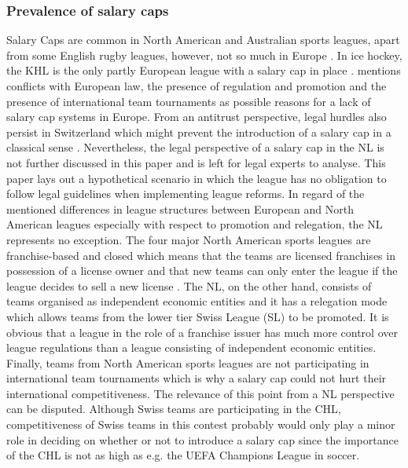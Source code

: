 \documentclass[12pt, a4paper]{article}
\begin{document}
\subsubsection{Prevalence of salary caps}

Salary Caps are common in North American and Australian sports leagues, apart from some English rugby leagues, however, not so much in Europe \citep{dietl_effect_2009}. In ice hockey, the KHL is the only partly European league with a salary cap in place \citep{noauthor_salary_2022}. \citet{lindholm_problem_2011} mentions conflicts with European law, the presence of regulation and promotion and the presence of international team tournaments as possible reasons for a lack of salary cap systems in Europe. From an antitrust perspective, legal hurdles also persist in Switzerland which might prevent the introduction of a salary cap in a classical sense \citep[see][]{wettbewerbskommission_weko_einfuhrung_2021}. Nevertheless, the legal perspective of a salary cap in the NL is not further discussed in this paper and is left for legal experts to analyse. This paper lays out a hypothetical scenario in which the league has no obligation to follow legal guidelines when implementing league reforms. In regard of the mentioned differences in league structures between European and North American leagues especially with respect to promotion and relegation, the NL represents no exception. The four major North American sports leagues are franchise-based and closed which means that the teams are licensed franchises in possession of a license owner and that new teams can only enter the league if the league decides to sell a new license \citep{cain_similar_2005}. The NL, on the other hand, consists of teams organised as independent economic entities and it has a relegation mode which allows teams from the lower tier Swiss League (SL) to be promoted. It is obvious that a league in the role of a franchise issuer has much more control over league regulations than a league consisting of independent economic entities. Finally, teams from North American sports leagues are not participating in international team tournaments which is why a salary cap could not hurt their international competitiveness. The relevance of this point from a NL perspective can be disputed. Although Swiss teams are participating in the CHL, competitiveness of Swiss teams in this contest probably would only play a minor role in deciding on whether or not to introduce a salary cap since the importance of the CHL is not as high as e.g. the UEFA Champions League in soccer.  
\end{document}
